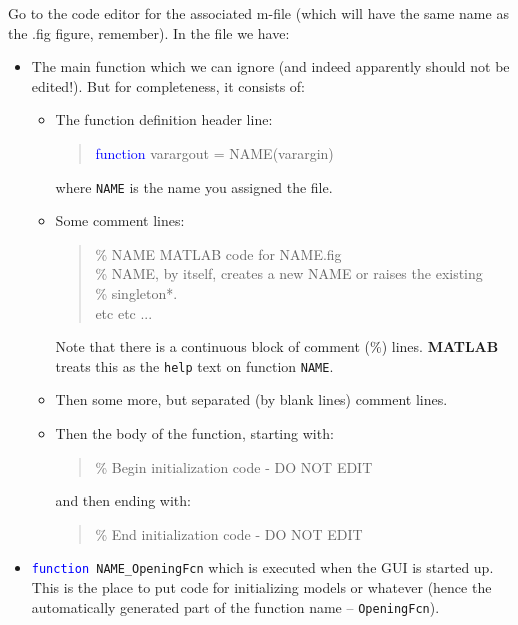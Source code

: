 \documentclass{tufte-book} %
\newenvironment{docspec}{\begin{quotation}\ttfamily\parskip0pt\parindent0pt\ignorespaces}{\end{quotation}}
\begin{document}
Go to the code editor for the associated \textsf{m-file} (which will have the same name as the \textsf{.fig} figure, remember). In the file we have:
\begin{itemize}
\setlength{\itemindent}{.2in}

\item The main function which we can ignore (and indeed apparently should not be edited!). But for completeness, it consists of:
\begin{itemize}[noitemsep]
\setlength{\itemindent}{.2in}
\item The function definition header line:
\begin{docspec}
\textcolor{blue}{function} varargout = NAME(varargin)
\end{docspec}
where \texttt{NAME} is the name you assigned the file.
\item Some comment lines:
\begin{docspec}
\textcolor[rgb]{0,0.501961,0}{\% NAME MATLAB code for NAME.fig\\
\%      NAME, by itself, creates a new NAME or raises the existing\\
\%      singleton*.}\\
etc etc ...
\end{docspec}
Note that there is a continuous block of comment (\textcolor[rgb]{0,0.501961,0}{\%}) lines. \textbf{MATLAB} treats this as the \texttt{help} text on function \texttt{NAME}.
\item Then some more, but separated (by blank lines) comment lines.
\item Then the body of the function, starting with:
\begin{docspec}
\textcolor[rgb]{0,0.501961,0}{\% Begin initialization code - DO NOT EDIT}
\end{docspec}
and then ending with:
\begin{docspec}
\textcolor[rgb]{0,0.501961,0}{\% End initialization code - DO NOT EDIT}
\end{docspec}
\end{itemize}

\item \texttt{\textcolor{blue}{function} NAME\_OpeningFcn} which is executed when the GUI is started up. This is the place to put code for initializing models or whatever (hence the automatically generated part of the function name -- \texttt{OpeningFcn}).


\end{itemize}
\end{document}
